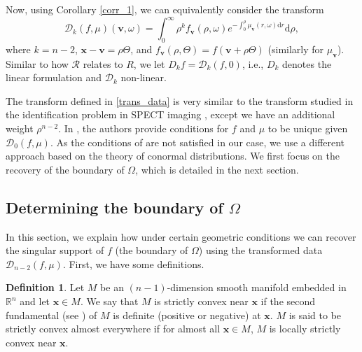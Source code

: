 \documentclass[a4paper,12pt]{amsart}
\numberwithin{equation}{section}
\theoremstyle{plain}
\numberwithin{theorem}{section}
\theoremstyle{definition}
\newtheorem{definition}[theorem]{Definition}
\theoremstyle{remark}
\theoremstyle{remark}
\theoremstyle{remark}
\newcommand{\vv}{{\mathbf{v}}}
\newcommand{\vx}{{\mathbf{x}}}
\newcommand{\vy}{{\mathbf{y}}}
\begin{document}
Now, using Corollary \ref{corr_1}, we can equivalently consider the transform
\begin{equation}\label{trans_data}
\mathcal{D}_k(f,\mu)(\vv, \omega) = \int_{0}^\infty \rho^{k} f_\vv(\rho,\omega) e^{ -\int_{0}^\rho\mu_\vv(r,\omega)\mathrm{d}r }  \mathrm{d}\rho,
\end{equation}
where $k = n-2$, $\vx - \vv = \rho\Theta$, and $f_\vv(\rho,\Theta) = f(\vv + \rho\Theta)$ (similarly for $\mu_\vv$). Similar to how $\mathcal{R}$ relates to $R$, we let $D_kf = \mathcal{D}_k(f,0)$, i.e., $D_k$ denotes the linear formulation and $\mathcal{D}_k$ non-linear.

The transform defined in \eqref{trans_data} is very similar to the transform studied in the identification problem in SPECT imaging \cite{holman2020spect,SeanHolman,natterer1981identification,solmon1995identification,stefanov2014identification}, except we have an additional weight $\rho^{n-2}$. In \cite{SeanHolman}, the authors provide conditions for $f$ and $\mu$ to be unique given $\mathcal{D}_0(f,\mu)$. As the conditions of \cite{SeanHolman} are not satisfied in our case, we use a different approach based on the theory of conormal distributions. We first focus on the recovery of the boundary of $\Omega$, which is detailed in the next section.

\subsection{Determining the boundary of $\Omega$} \label{sec:bdet}
In this section, we explain how under certain geometric conditions we can recover the singular support of $f$ (the boundary of $\Omega$) using the transformed data $\mathcal{D}_{n-2}(f,\mu)$. First, we have some definitions.
\begin{definition} \label{def:Strictconv}
Let $M$ be an $(n-1)$-dimension smooth manifold embedded in $\mathbb{R}^n$ and let $\vx \in M$. %
We say that $M$ is strictly convex near $\vx$ if the second fundamental (see \cite{lee2018introduction}) of $M$ is definite (positive or negative) at $\vx$. %
$M$ is said to be strictly convex almost everywhere if for almost all $\vx \in M$, $M$ is locally strictly convex near $\vx$. 
\end{definition}
\end{document}
